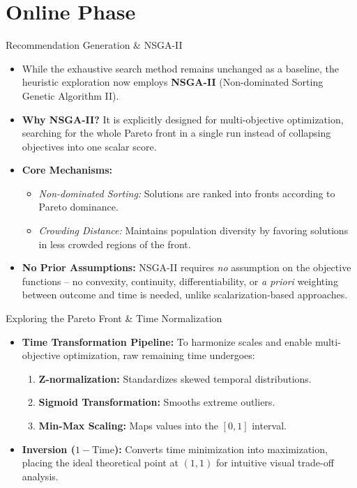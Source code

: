 \documentclass[aspectratio=169]{beamer} %
\begin{document}
\section{Online Phase}

\begin{frame}{Recommendation Generation \& NSGA-II}
    \begin{itemize}
        \item While the exhaustive search method remains unchanged as a baseline, the heuristic exploration now employs \textbf{NSGA-II} (Non-dominated Sorting Genetic Algorithm II).
        \item \textbf{Why NSGA-II?} It is explicitly designed for multi-objective optimization, searching for the whole Pareto front in a single run instead of collapsing objectives into one scalar score.
        \item \textbf{Core Mechanisms:}
        \begin{itemize}
            \item \textit{Non-dominated Sorting:} Solutions are ranked into fronts according to Pareto dominance.
            \item \textit{Crowding Distance:} Maintains population diversity by favoring solutions in less crowded regions of the front.
        \end{itemize}
        \item \textbf{No Prior Assumptions:} NSGA-II requires \emph{no} assumption on the objective functions -- no convexity, continuity, differentiability, or \textit{a priori} weighting between outcome and time is needed, unlike scalarization-based approaches.
    \end{itemize}
\end{frame}

\begin{frame}{Exploring the Pareto Front \& Time Normalization}
    \begin{itemize}
        \item \textbf{Time Transformation Pipeline:} To harmonize scales and enable multi-objective optimization, raw remaining time undergoes:
        \begin{enumerate}
            \item \textbf{Z-normalization:} Standardizes skewed temporal distributions.
            \item \textbf{Sigmoid Transformation:} Smooths extreme outliers.
            \item \textbf{Min-Max Scaling:} Maps values into the $[0, 1]$ interval.
        \end{enumerate}
        \item \textbf{Inversion ($1 - \text{Time}$):} Converts time minimization into maximization, placing the ideal theoretical point at $(1,1)$ for intuitive visual trade-off analysis.
    \end{itemize}
\end{frame}
\end{document}
